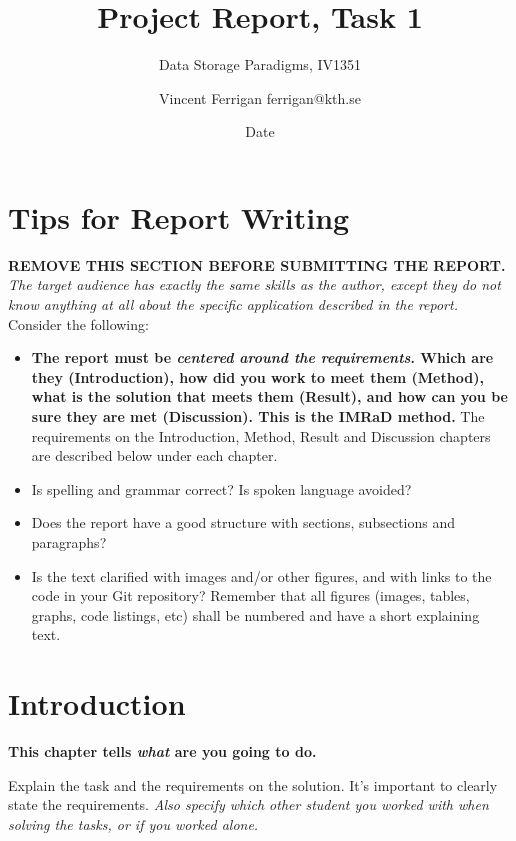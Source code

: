 \documentclass[a4paper]{scrartcl}
\title{Project Report, Task 1}
\subtitle{Data Storage Paradigms, IV1351}
\author{Vincent Ferrigan ferrigan@kth.se}
\date{Date}
\begin{document}
\maketitle
    
\section*{Tips for Report Writing}
\textbf{REMOVE THIS SECTION BEFORE SUBMITTING THE REPORT.}\\

\noindent \textit{The target audience has exactly the same skills as the author, except they do not know anything at all about the specific application described in the report.} \\

Consider the following:

\begin{itemize}
  \item \textbf{The report must be \textit{centered around the requirements}. Which are they (Introduction), how did you work to meet them (Method), what is the solution that meets them (Result), and how can you be sure they are met (Discussion). This is the IMRaD method.} The requirements on the Introduction, Method, Result and Discussion chapters are described below under each chapter.

  \item Is spelling and grammar correct? Is spoken language avoided?

  \item Does the report have a good structure with sections, subsections and paragraphs?

  \item Is the text clarified with images and/or other figures, and with links to the code in your Git repository? Remember that all figures (images, tables, graphs, code listings, etc) shall be numbered and have a short explaining text.
\end{itemize}

\section{Introduction}

\textbf{This chapter tells \textit{what} are you going to do.} 

Explain the task and the requirements on the solution. It's important to clearly state the requirements. \textit{Also specify which other student you worked with when solving the tasks, or if you worked alone.} 
\end{document}
